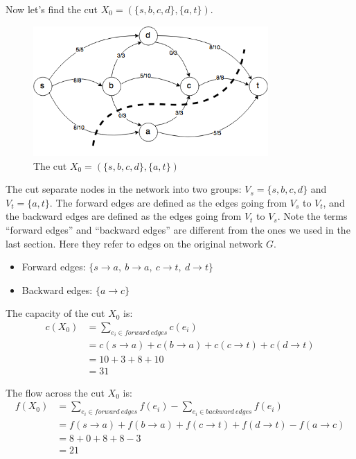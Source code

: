 \documentclass{article}
\begin{document}
Now let's find the cut $X_0 = (\{s,b,c,d\}, \{a,t\})$.

\begin{figure}[H]
\centering
\includegraphics[width=0.8\textwidth]{g_2.png}
\caption{The cut $X_0 = (\{s,b,c,d\}, \{a,t\})$}
\end{figure}

The cut separate nodes in the network into two groups:
$V_s = \{s, b, c, d\}$ and $V_t = \{a, t\}$. The forward edges are defined
as the edges going from $V_s$ to $V_t$, and the backward edges are defined
as the edges going from $V_t$ to $V_s$. 
Note the terms ``forward edges''
and ``backward edges'' are different from the ones we used in the last section.
Here they refer to edges on the original network $G$.
\begin{itemize}
\item Forward edges: $\{s \rightarrow a,~ b \rightarrow a,~ c \rightarrow t,~
d\rightarrow t\}$
\item Backward edges: $\{a \rightarrow c\}$
\end{itemize}

The capacity of the cut $X_0$ is:
\begin{equation}
	\begin{split}
		c(X_0) &= \sum_{e_i \in forward~edges} c(e_i)\\
		&=c(s \rightarrow a) + c(b \rightarrow a) + 
		c(c \rightarrow t) + c(d\rightarrow t)\\
		&= 10 + 3 + 8 + 10 \\
		&= 31
	\end{split}
\end{equation}

The flow across the cut $X_0$ is:
\begin{equation}
	\begin{split}
		f(X_0) &= \sum_{e_i \in forward~edges} f(e_i)
		- \sum_{e_i \in backward~edges} f(e_i)\\
		&= f(s \rightarrow a) + f(b \rightarrow a) + 
		f(c \rightarrow t) + f(d\rightarrow t) - f(a \rightarrow c)\\
		&= 8+0+8+8-3\\
		&= 21
	\end{split}
\end{equation}
\end{document}
